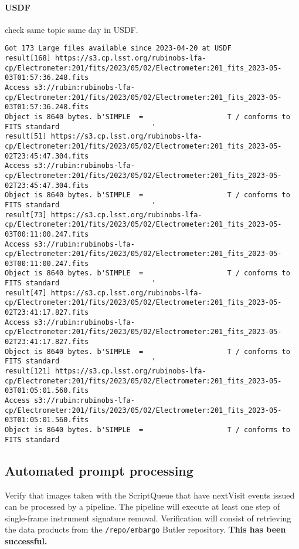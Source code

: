 \paragraph{USDF} check same topic same day in USDF.
\begin{lstlisting}
Got 173 Large files available since 2023-04-20 at USDF
result[168] https://s3.cp.lsst.org/rubinobs-lfa-cp/Electrometer:201/fits/2023/05/02/Electrometer:201_fits_2023-05-03T01:57:36.248.fits
Access s3://rubin:rubinobs-lfa-cp/Electrometer:201/fits/2023/05/02/Electrometer:201_fits_2023-05-03T01:57:36.248.fits
Object is 8640 bytes. b'SIMPLE  =                    T / conforms to FITS standard                      '
result[51] https://s3.cp.lsst.org/rubinobs-lfa-cp/Electrometer:201/fits/2023/05/02/Electrometer:201_fits_2023-05-02T23:45:47.304.fits
Access s3://rubin:rubinobs-lfa-cp/Electrometer:201/fits/2023/05/02/Electrometer:201_fits_2023-05-02T23:45:47.304.fits
Object is 8640 bytes. b'SIMPLE  =                    T / conforms to FITS standard                      '
result[73] https://s3.cp.lsst.org/rubinobs-lfa-cp/Electrometer:201/fits/2023/05/02/Electrometer:201_fits_2023-05-03T00:11:00.247.fits
Access s3://rubin:rubinobs-lfa-cp/Electrometer:201/fits/2023/05/02/Electrometer:201_fits_2023-05-03T00:11:00.247.fits
Object is 8640 bytes. b'SIMPLE  =                    T / conforms to FITS standard                      '
result[47] https://s3.cp.lsst.org/rubinobs-lfa-cp/Electrometer:201/fits/2023/05/02/Electrometer:201_fits_2023-05-02T23:41:17.827.fits
Access s3://rubin:rubinobs-lfa-cp/Electrometer:201/fits/2023/05/02/Electrometer:201_fits_2023-05-02T23:41:17.827.fits
Object is 8640 bytes. b'SIMPLE  =                    T / conforms to FITS standard                      '
result[121] https://s3.cp.lsst.org/rubinobs-lfa-cp/Electrometer:201/fits/2023/05/02/Electrometer:201_fits_2023-05-03T01:05:01.560.fits
Access s3://rubin:rubinobs-lfa-cp/Electrometer:201/fits/2023/05/02/Electrometer:201_fits_2023-05-03T01:05:01.560.fits
Object is 8640 bytes. b'SIMPLE  =                    T / conforms to FITS standard
\end{lstlisting}

\subsection{Automated prompt processing}
Verify that images taken with the ScriptQueue that have nextVisit events issued can be processed by a pipeline.
The pipeline will execute at least one step of single-frame instrument signature removal.
Verification will consist of retrieving the data products from the \texttt{/repo/embargo} Butler repository.
\textbf{This has been successful.}
